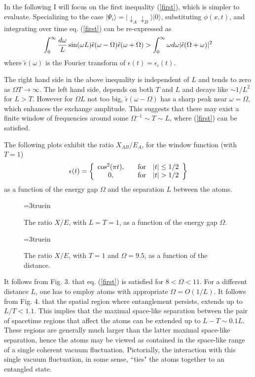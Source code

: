 \documentclass[12pt]{article}
\newcommand{\beq}{\begin{equation}}
\newcommand{\eeq}{\end{equation}}
\def \ra {\rangle}
\def \down {\downarrow}
\begin{document}
In the following I will focus on the first inequality
(\ref{first}), which is simpler to evaluate.
Specializing to the case $|\Psi_i\ra=|\down_A\down_B\ra|0\ra$,
substituting $\phi(x,t)$, and
integrating over time
eq. (\ref{first}) can be re-expressed as
\beq
  \int_0^\infty {d\omega\over L} \sin({\omega L}) \tilde\epsilon
(\omega-\Omega)
\tilde\epsilon(\omega+\Omega) >
\int_0^\infty \omega d\omega |\tilde\epsilon (\Omega+\omega)|^2
\eeq
where $\tilde\epsilon(\omega)$
is the Fourier transform of $\epsilon(t)=\epsilon_i(t)$.

The right hand side in the above inequality is independent of $L$ and tends to
zero as $\Omega T\to \infty$. The left hand side, depends on both $T$ and $L$
and decays like $\sim 1/L^2$ for $L>T$.
However for $\Omega L$ not too big,
$\tilde \epsilon(\omega-\Omega)$ has a sharp peak near
 $\omega=\Omega$, which enhances the exchange amplitude.
This suggests that there may exist a finite window of
frequencies around some $\Omega^{-1}\sim T \sim L$, where (\ref{first})
can be satisfied.

The following plots exhibit
the ratio $X_{AB}/E_A$, for the window function (with $T=1$)
\beq
\epsilon(t) = \left\{   \begin{array}{cc} {\cos^2(\pi t)},
& \ \ \ {\rm for} \ \ \ |t| \le 1/2 \\
              0 , &  \ \ \ {\rm for} \ \ \ |t|>1/2 \end{array}  \right\}
\eeq
as a function of the energy gap $\Omega$ and the separation $L$
between the atoms.

\begin{figure} \epsfxsize=3truein
      \centerline{}
\vspace {0.5cm}
  \caption[]{The ratio $X/E$,
with $L=T=1$, as a function of the energy gap $\Omega$.  }
    \label{ratio} \end{figure}

\begin{figure} \epsfxsize=3truein
      \centerline{}
\vspace {0.5cm}
  \caption[]{The ratio $X/E$, with $T=1$ and $\Omega=9.5$,
as a function of the distance.   }
    \label{ratiol} \end{figure}

It follows from Fig. 3. that eq. (\ref{first}) is satisfied for
 $8<\Omega <11$.
 For a different distance $L$,
one has to employ atoms with appropriate $\Omega =O(1/L)$.
It follows from Fig. 4. that the spatial region where entanglement persists,
extends up to $L/T<1.1$. This implies that the maximal
space-like separation between the pair of spacetime regions
that affect the atoms can be extended up to  $L-T \sim 0.1 L$.
These regions are generally much larger than the latter maximal
space-like separation, hence the atoms may be viewed as contained in
the space-like range of a single coherent vacuum fluctuation.
Pictorially, the interaction with this single vacuum fluctuation,
in some sense, ``ties" the atoms together to an entangled state.
\end{document}
